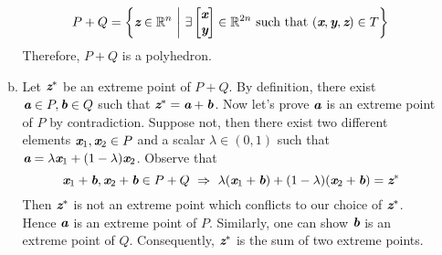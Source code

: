 \begin{enumerate}
\begin{enumerate}[(a)]
\[		P+Q = \left\{ \bz \in \mathbb{R}^n ~\middle |~ \exists \begin{bmatrix}
		\bx\\\by
		\end{bmatrix}\in \mathbb{R}^{2n} \text{ such that }(\bx,\by,\bz )\in T\right\}
		\]
		Therefore, $P+Q$ is a polyhedron.
		\newpage 
		\item Let $\bz^*$ be an extreme point of $P+Q$. By definition, there exist $\ba\in P, \bb\in Q$ such that $\bz^*=\ba+\bb$. Now let's prove $\ba$ is an extreme point of $P$ by contradiction.
		Suppose not, then there exist two different elements $\bx_1, \bx_2\in P$ and a scalar $\lambda\in (0,1)$ such that $\ba = \lambda \bx_1 + (1-\lambda)\bx_2$. Observe that 
		\[
		\bx_1 + \bb, \bx_2 +\bb \in P+Q ~\Rightarrow~ \lambda (\bx_1+\bb) +(1-\lambda)(\bx_2+\bb) =\bz^*
		\]
		Then $\bz^*$ is not an extreme point which conflicts to our choice of $\bz^*$. Hence $\ba$ is an extreme point of $P$. Similarly, one can show $\bb$ is an extreme point of $Q$. Consequently, $\bz^*$ is the sum of two extreme points. 
		
	\end{enumerate}
\end{enumerate}
